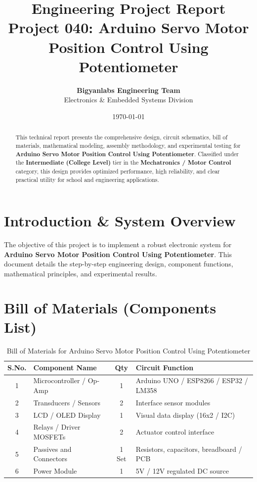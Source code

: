 \documentclass[11pt,a4paper]{article}
\title{\textbf{\Huge Engineering Project Report}\\[0.5em] \Large Project 040: Arduino Servo Motor Position Control Using Potentiometer}
\author{\textbf{Bigyanlabs Engineering Team}\\ Electronics \& Embedded Systems Division}
\date{\today}
\begin{document}
\maketitle
\thispagestyle{empty}

\begin{abstract}
This technical report presents the comprehensive design, circuit schematics, bill of materials, mathematical modeling, assembly methodology, and experimental testing for \textbf{Arduino Servo Motor Position Control Using Potentiometer}. Classified under the \textbf{Intermediate (College Level)} tier in the \textbf{Mechatronics / Motor Control} category, this design provides optimized performance, high reliability, and clear practical utility for school and engineering applications.
\end{abstract}

\newpage
\tableofcontents
\newpage

\section{Introduction \& System Overview}
The objective of this project is to implement a robust electronic system for \textbf{Arduino Servo Motor Position Control Using Potentiometer}. This document details the step-by-step engineering design, component functions, mathematical principles, and experimental results.

\section{Bill of Materials (Components List)}
\begin{table}[h!]
\centering
\caption{Bill of Materials for Arduino Servo Motor Position Control Using Potentiometer}
\vspace{0.5em}
\begin{tabular}{clcp{7cm}}
\toprule
\textbf{S.No.} & \textbf{Component Name} & \textbf{Qty} & \textbf{Circuit Function} \\
\midrule
1 & Microcontroller / Op-Amp & 1 & Arduino UNO / ESP8266 / ESP32 / LM358 \\
2 & Transducers / Sensors & 2 & Interface sensor modules \\
3 & LCD / OLED Display & 1 & Visual data display (16x2 / I2C) \\
4 & Relays / Driver MOSFETs & 2 & Actuator control interface \\
5 & Passives and Connectors & 1 Set & Resistors, capacitors, breadboard / PCB \\
6 & Power Module & 1 & 5V / 12V regulated DC source \\
\bottomrule
\end{tabular}
\end{table}
\end{document}
